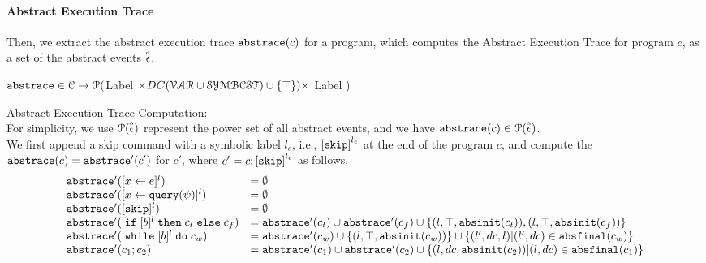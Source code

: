  \paragraph{Abstract Execution Trace}
 Then, we  extract the abstract execution trace  $\mathtt{abs}{\mathtt{trace}}(c)$ for a program, which computes the Abstract Execution Trace for program $c$, as a set of the abstract events $\stackrel{\scriptscriptstyle{\alpha}}{\mathtt{\epsilon}{}}$.
 \begin{defn}
 \label{def:abs_trace}
  $\mathtt{abs}{\mathtt{trace}} \in \mathcal{C} \to \mathcal{P}($Label $\times DC(\mathcal{VAR}  \cup \mathcal{SYMBCST}) \cup \{\top\}) \times $ Label )
  \end{defn}
 Abstract Execution Trace Computation:
  \\
  For simplicity, we use $\mathcal{P}(\stackrel{\scriptscriptstyle{\alpha}}{\mathtt{\epsilon}{}})$ represent the power set of all abstract events, and we have $\mathtt{abs}{\mathtt{trace}}(c) \in \mathcal{P}(\stackrel{\scriptscriptstyle{\alpha}}{\mathtt{\epsilon}{}})$.
 \\
 We first append a skip command with a symbolic label $l_e$, i.e., $\clabel{\eskip}^{l_e}$ at the end of the program $c$, and compute the $\mathtt{abs}{\mathtt{trace}}(c) = \mathtt{abs}{\mathtt{trace}}'(c')$ for $c'$, where $c' = c;\clabel{\eskip}^{l_e}$ as follows,
 {\footnotesize
 \[
   \begin{array}{ll}
      \absflow'(\clabel{\assign{x}{\expr}}{}^l)  & = \emptyset  \\
      \absflow'(\clabel{\assign{x}{\query(\qexpr)}}{}^l)  & = \emptyset  \\
      \absflow'([\eskip]^{l})  & = \emptyset \\
      \absflow'(\eif [b]^l \ethen c_t \eelse c_f)  & =  \absflow'(c_t) \cup \absflow'(c_f)
        \cup \{(l, \top,  \absinit(c_t) ) ,  (l, \top, \absinit(c_f)) \} \\
       \absflow'(\ewhile [b]^l \edo c_w)  & =  \absflow'(c_w) \cup \{(l, \top, \absinit(c_w)) \} 
       \cup \{(l', dc, l)| (l', dc) \in \absfinal(c_w) \} \\
       \absflow'(c_1 ; c_2)  & = \absflow'(c_1) \cup  \absflow'(c_2) 
       \cup \{ (l, dc, \absinit(c_2)) | (l, dc) \in \absfinal(c_1) \} \\
   \end{array}
   \]
   }

